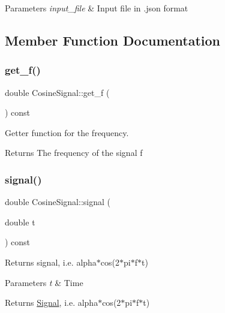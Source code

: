 \begin{DoxyParams}{Parameters}
{\em input\+\_\+file} & Input file in .json format \\
\hline
\end{DoxyParams}


\subsection{Member Function Documentation}
\mbox{\label{classCosineSignal_ae4d286b605aa34aca31619f121fe0b41}} 
\subsubsection{\texorpdfstring{get\+\_\+f()}{get\_f()}}
{\footnotesize\ttfamily double Cosine\+Signal\+::get\+\_\+f (\begin{DoxyParamCaption}{ }\end{DoxyParamCaption}) const\hspace{0.3cm}{\ttfamily [inline]}}



Getter function for the frequency. 

\begin{DoxyReturn}{Returns}
The frequency of the signal f 
\end{DoxyReturn}
\mbox{\label{classCosineSignal_a541f39de155f6a92162882ce102480bd}} 
\subsubsection{\texorpdfstring{signal()}{signal()}}
{\footnotesize\ttfamily double Cosine\+Signal\+::signal (\begin{DoxyParamCaption}\item[{double}]{t }\end{DoxyParamCaption}) const\hspace{0.3cm}{\ttfamily [virtual]}}



Returns signal, i.\+e. alpha$\ast$cos(2$\ast$pi$\ast$f$\ast$t) 


\begin{DoxyParams}{Parameters}
{\em t} & Time \\
\hline
\end{DoxyParams}
\begin{DoxyReturn}{Returns}
\hyperlink{classSignal}{Signal}, i.\+e. alpha$\ast$cos(2$\ast$pi$\ast$f$\ast$t) 
\end{DoxyReturn}


